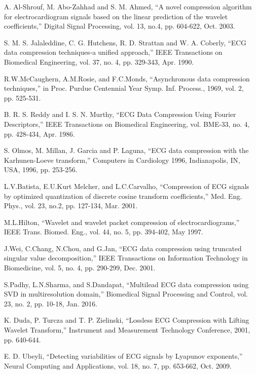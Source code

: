 \documentclass[journal]{IEEEtran}
\begin{document}
{\begin{thebibliography}{99}
		A. Al-Shrouf, M. Abo-Zahhad and S. M. Ahmed, ``A novel compression algorithm for electrocardiogram signals based on the linear prediction of the wavelet coefficients,'' Digital Signal Processing, vol. 13, no.4, pp. 604-622, Oct. 2003.

		S. M. S. Jalaleddine, C. G. Hutchens, R. D. Strattan and W. A. Coberly, ``ECG data compression techniques-a unified approach,'' IEEE Transactions on Biomedical Engineering, vol. 37, no. 4, pp. 329-343, Apr. 1990.

		R.W.McCaughern, A.M.Rosie, and F.C.Monds, ``Asynchronous data compression techniques,'' in Proc. Purdue Centennial Year Symp. Inf. Process., 1969, vol. 2, pp. 525-531.

		B. R. S. Reddy and I. S. N. Murthy, ``ECG Data Compression Using Fourier Descriptors,'' IEEE Transactions on Biomedical Engineering, vol. BME-33, no. 4, pp. 428-434, Apr. 1986.

		S. Olmos, M. Millan, J. Garcia and P. Laguna, ``ECG data compression with the Karhunen-Loeve transform,'' Computers in Cardiology 1996, Indianapolis, IN, USA, 1996, pp. 253-256.

		L.V.Batista, E.U.Kurt Melcher, and L.C.Carvalho, ``Compression of ECG signals by optimized quantization of discrete cosine transform coefficients,'' Med. Eng. Phys., vol. 23, no.2, pp. 127-134, Mar. 2001.

		M.L.Hilton, ``Wavelet and wavelet packet compression of electrocardiograms,'' IEEE Trans. Biomed. Eng., vol. 44, no. 5, pp. 394-402, May 1997.

		J.Wei, C.Chang, N.Chou, and G.Jan, ``ECG data compression using truncated singular value decomposition,'' IEEE Transactions on Information Technology in Biomedicine, vol. 5, no. 4, pp. 290-299, Dec. 2001.

		S.Padhy, L.N.Sharma, and S.Dandapat, ``Multilead ECG data compression using SVD in multiresolution domain,'' Biomedical Signal Processing and Control, vol. 23, no. 2, pp. 10-18, Jan. 2016.

		K. Duda, P. Turcza and T. P. Zielinski, ``Lossless ECG Compression with Lifting Wavelet Transform,'' Instrument and Measurement Technology Conference, 2001, pp. 640-644.

		E. D. Ubeyli, ``Detecting variabilities of ECG signals by Lyapunov exponents,'' Neural Computing and Applications, vol. 18, no. 7, pp. 653-662, Oct. 2009.


\end{thebibliography}}
\end{document}
